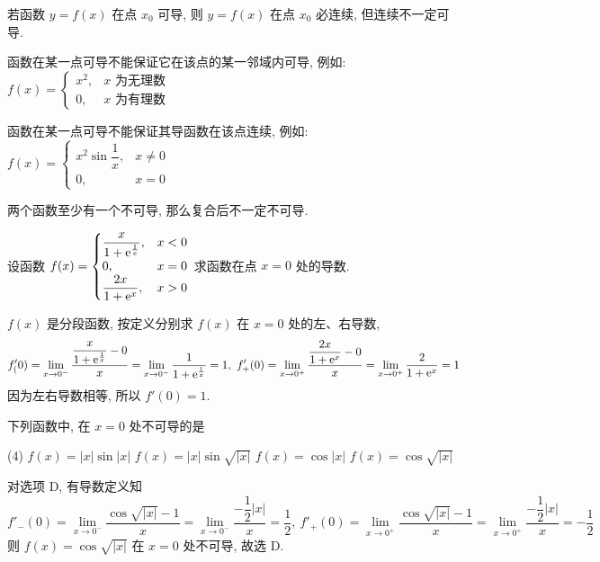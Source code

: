 \begin{theorem}[函数的可导性与连续性]
    若函数 $y=f(x)$ 在点 $x_0$ 可导, 则 $y=f(x)$ 在点 $x_0$ 必连续, 但连续不一定可导.

    函数在某一点可导不能保证它在该点的某一邻域内可导, 例如: $f(x)=\begin{cases}
            x^2, & x\text{ 为无理数} \\
            0,   & x\text{ 为有理数}
        \end{cases}$

    函数在某一点可导不能保证其导函数在该点连续, 例如: $f(x)=\begin{cases}
            x^2\sin\dfrac{1}{x}, & x\neq0 \\
            0,                   & x=0
        \end{cases}$

    两个函数至少有一个不可导, 那么复合后不一定不可导.
\end{theorem}

\begin{example}
    设函数 $f(x)=\begin{cases}
            \dfrac{x}{1+\mathrm{e} ^{\frac{1}{x}}}, & x<0 \\0,&x=0\\ \dfrac{2x}{1+\mathrm{e}^x},&x>0
        \end{cases}$ 求函数在点 $x=0$ 处的导数.
\end{example}
\begin{solution}
    $f(x)$ 是分段函数, 按定义分别求 $f(x)$ 在 $x=0$ 处的左、右导数,
    $$f'_(0)=\lim_{x\to0^-}\dfrac{\dfrac{x}{1+\mathrm{e} ^{\frac{1}{x}}}-0}{x}=\lim_{x\to0 ^-}\dfrac{1}{1+\mathrm{e} ^{\frac{1}{x}}}=1,~f'_+(0)=\lim_{x\to0^+}\dfrac{\dfrac{2x}{1+\mathrm{e}^x}-0}{x}=\lim_{x\to0^+}\dfrac{2}{1+\mathrm{e}^x}=1$$
    因为左右导数相等, 所以 $f'(0)=1$.
\end{solution}

\begin{example}[2018 数一]
    下列函数中, 在 $x=0$ 处不可导的是
    \begin{tasks}(4)
        \task $f(x)=|x|\sin |x|$
        \task $f(x)=|x|\sin \sqrt{|x|}$
        \task $f(x)=\cos |x|$
        \task $f(x)=\cos \sqrt{|x|}$
    \end{tasks}
\end{example}
\begin{solution}
    对选项 D, 有导数定义知
    $$f'_-(0)=\lim_{x\to0^-}\dfrac{\cos\sqrt{|x|}-1}{x}=\lim_{x\to0^-}\dfrac{-\dfrac{1}{2}|x|}{x}=\dfrac{1}{2},~f'_+(0)=\lim_{x\to0^+}\dfrac{\cos\sqrt{|x|}-1}{x}=\lim_{x\to0^+}\dfrac{-\dfrac{1}{2}|x|}{x}=-\dfrac{1}{2}$$
    则 $f(x)=\cos \sqrt{|x|}$ 在 $x=0$ 处不可导, 故选 D.
\end{solution}

